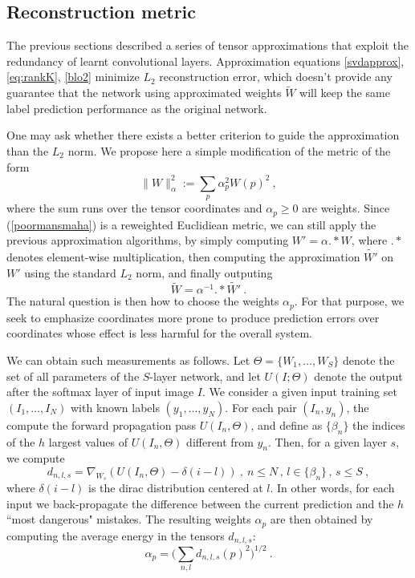 \subsection{Reconstruction metric}

The previous sections described a series of tensor 
approximations that exploit the redundancy of learnt convolutional 
layers. 
Approximation equations \ref{svdapprox}, \ref{eq:rankK}, \ref{blo2} minimize $L_2$ 
reconstruction error, which doesn't 
provide any guarantee that the network using approximated weights $\widetilde{W}$ 
will keep the same label prediction performance as the original network. 

One may ask  whether there exists a better criterion to guide the approximation than 
the $L_2$ norm. We propose here a simple modification of the metric of the form 
\begin{equation}
\label{poormansmaha}
\| W \|_\alpha^2 := \sum_p \alpha_p^2 W(p)^2 ~,
\end{equation}
where the sum runs over the tensor coordinates and $\alpha_p \geq 0$ are weights.
Since (\ref{poormansmaha}) is a reweighted Euclidiean metric, we can
still apply the previous approximation algorithms, by simply 
computing $W' = \alpha .* W$, where $.*$ denotes element-wise multiplication, 
then computing the approximation $\widetilde{W'}$ on $W'$ using the standard $L_2$ norm, 
and finally outputing $$\widetilde{W} = \alpha^{-1} .* \widetilde{W'}~.$$
The natural question is then how to choose the weights $\alpha_p$. For that purpose, 
we seek to emphasize coordinates more prone to produce prediction errors over 
coordinates whose effect is less harmful for the overall system. 

We can obtain such measurements as follows. Let $\Theta=\{W_1,\dots,W_S\}$ denote
the set of all parameters of the $S$-layer network, and let $U(I; \Theta)$ denote the output 
after the softmax layer of input image $I$.
We consider  a given input training set $(I_1,\dots,I_N)$ 
with known labels $(y_1,\dots,y_N)$. For each pair $(I_n, y_n)$, 
the compute the forward propagation pass $U(I_n, \Theta)$, and 
define as $\{\beta_n\}$ the indices of the $h$ largest values of  $U(I_n, \Theta)$ 
different from $y_n$.
Then, for a given layer $s$, we compute
\begin{equation}
\label{approxi}
d_{n,l,s} = \nabla_{W_s} \left( U(I_n, \Theta) - \delta(i - l)\right)~,~n\leq N\,,\, l \in \{\beta_n\}\,,\, s\leq S~,
\end{equation}
where $\delta(i-l)$ is the dirac distribution centered at $l$.
In other words, for each input we back-propagate the difference between the current prediction and the 
$h$ ``most dangerous" mistakes. 
The resulting weights $\alpha_p$ are then obtained by computing the average energy in the tensors $d_{n,l,s}$:
$$\alpha_p = \Big( \sum_{n,l} d_{n,l,s}(p)^2 \Big)^{1/2}~.$$


